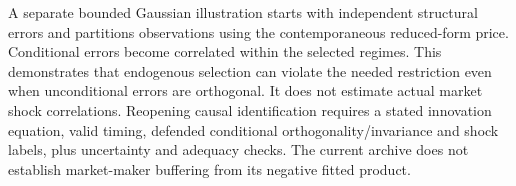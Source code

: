 A separate bounded Gaussian illustration starts with independent structural errors and partitions observations using the contemporaneous reduced-form price. Conditional errors become correlated within the selected regimes. This demonstrates that endogenous selection can violate the needed restriction even when unconditional errors are orthogonal. It does not estimate actual market shock correlations. Reopening causal identification requires a stated innovation equation, valid timing, defended conditional orthogonality/invariance and shock labels, plus uncertainty and adequacy checks. The current archive does not establish market-maker buffering from its negative fitted product.
